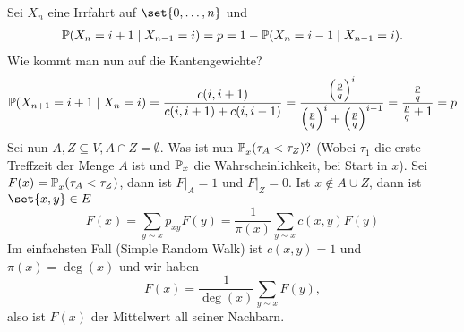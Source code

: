\begin{beispiel}
	\label{bsp:GamblersRun}
	Sei $X_n$ eine Irrfahrt auf $\set{0, \dots, n}$ und	
	\begin{gather}
		\prop{X_n = i+1 \given X_{n-1} = i} = p = 1 - \prop{X_n = i-1 \given X_{n-1} = i}.
	\end{gather}
	Wie kommt man nun auf die Kantengewichte?
	\begin{gather}
		\prop{X_{n+1} = i+1 \given X_n = i} = \frac{c(i,i+1)}{c(i,i+1)+c(i,i-1)} = \frac{\enb{\frac{p}{q}}^i}{\enb{\frac{p}{q}}^i + \enb{\frac{p}{q}}^{i-1}} = \frac{\frac{p}{q}}{\frac{p}{q} +1} = p
	\end{gather}
	Sei nun $A,Z \subseteq V, A \cap Z = \emptyset$. Was ist nun $\prop{\tau_A < \tau_Z}[][x]?$ (Wobei $\tau_1$ die erste Treffzeit der Menge $A$ ist und $\mathbb{P}_x$ die Wahrscheinlichkeit, bei Start in $x$). Sei $F(x) = \prop{\tau_A < \tau_Z}[][x]$, dann ist $F|_A = 1$ und $F|_Z = 0$. Ist $x \notin A \cup Z$, dann ist $\set{x,y} \in E$ 
	\begin{equation}
		F(x) = \sum\limits_{y \sim x} p_{xy} F(y) = \frac{1}{\pi(x)} \sum\limits_{y \sim x} c(x,y)F(y) \tag{*} \label{eqn:GamblersRun}
	\end{equation}
	Im einfachsten Fall (Simple Random Walk) ist $c(x,y) = 1$ und $\pi(x) = \deg(x)$  und wir haben
	\begin{equation}
		F(x) = \frac{1}{\deg(x)} \sum\limits_{y \sim x} F(y),
	\end{equation}
	also ist $F(x)$ der Mittelwert all seiner Nachbarn. 
\end{beispiel}

